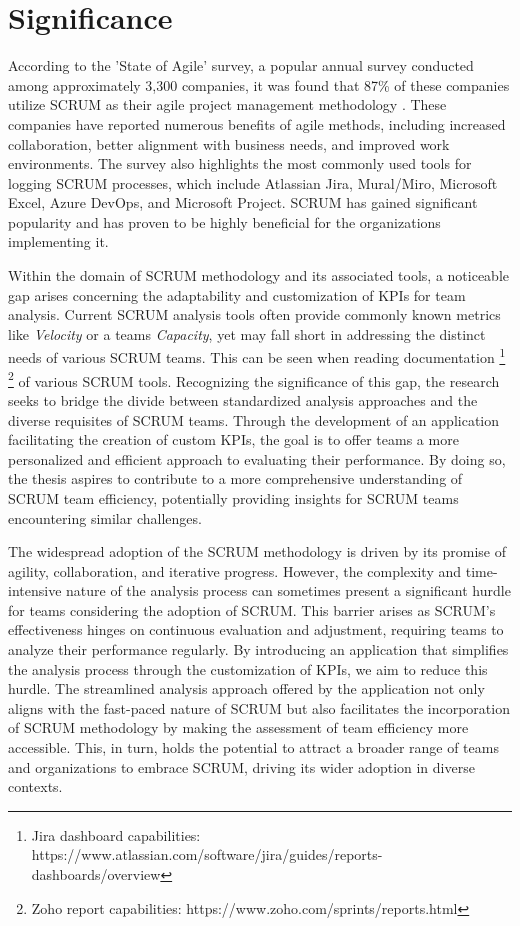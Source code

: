 \section{Significance}

According to the 'State of Agile' survey, a popular annual survey conducted among 
approximately 3,300 companies, it was found that 87\% of these companies utilize SCRUM 
as their agile project management methodology \parencite{StateOfAgile2023}. 
These companies have reported numerous benefits of agile methods, including increased 
collaboration, better alignment with business needs, and improved work environments. 
The survey also highlights the most commonly used tools for logging SCRUM processes, which 
include Atlassian Jira, Mural/Miro, Microsoft Excel, Azure DevOps, and Microsoft Project. 
SCRUM has gained significant popularity and has proven to be highly beneficial for the 
organizations implementing it.

Within the domain of SCRUM methodology and its associated tools, a noticeable 
gap arises concerning the adaptability and customization of KPIs for team analysis. 
Current SCRUM analysis tools often provide commonly known metrics like \textit{Velocity} or a teams \textit{Capacity}, 
yet may fall short in addressing the distinct needs of various SCRUM teams. 
This can be seen when reading documentation
\footnote{Jira dashboard capabilities: https://www.atlassian.com/software/jira/guides/reports-dashboards/overview}
\footnote{Zoho report capabilities: https://www.zoho.com/sprints/reports.html} of various SCRUM tools.  
Recognizing the significance of this gap, the research seeks to bridge the divide between 
standardized analysis approaches and the diverse requisites of SCRUM teams. 
Through the development of an application facilitating the creation of custom KPIs, 
the goal is to offer teams a more personalized and efficient approach to evaluating 
their performance. By doing so, the thesis aspires to contribute to a more comprehensive 
understanding of SCRUM team efficiency, potentially providing insights for SCRUM teams 
encountering similar challenges.

The widespread adoption of the SCRUM methodology is driven by its promise of agility, collaboration, and iterative progress. However, the complexity and time-intensive nature of the analysis process can sometimes present a significant hurdle for teams considering the adoption of SCRUM. This barrier arises as SCRUM's effectiveness hinges on continuous evaluation and adjustment, requiring teams to analyze their performance regularly. By introducing an application that simplifies the analysis process through the customization of KPIs, we aim to reduce this hurdle. The streamlined analysis approach offered by the application not only aligns with the fast-paced nature of SCRUM but also facilitates the incorporation of SCRUM methodology by making the assessment of team efficiency more accessible. This, in turn, holds the potential to attract a broader range of teams and organizations to embrace SCRUM, driving its wider adoption in diverse contexts.

